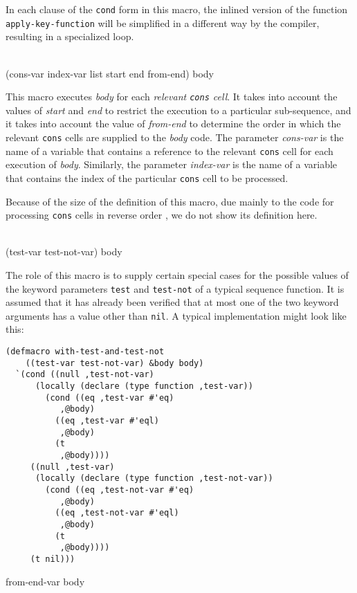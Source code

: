 In each clause of the \texttt{cond} form in this macro, the inlined
version of the function \texttt{apply-key-function} will be simplified
in a different way by the compiler, resulting in a specialized loop.

\\
{(cons-var index-var list start end from-end) \body body}

This macro executes \textit{body} for each \emph{relevant
  \texttt{cons} cell}.  It takes into account the values of
\textit{start} and \textit{end} to restrict the execution to a
particular sub-sequence, and it takes into account the value of
\textit{from-end} to determine the order in which the relevant
\texttt{cons} cells are supplied to the \textit{body} code.  The
parameter \textit{cons-var} is the name of a variable that contains a
reference to the relevant \texttt{cons} cell for each execution of
\textit{body}.  Similarly, the parameter \textit{index-var} is the
name of a variable that contains the index of the particular
\texttt{cons} cell to be processed.

Because of the size of the definition of this macro, due mainly to the
code for processing \texttt{cons} cells in reverse order
\cite{Durand:2015:ELS:reverse}, we do not show its definition here.

\\
{(test-var test-not-var) \body body}

The role of this macro is to supply certain special cases for the
possible values of the keyword parameters \texttt{test} and
\texttt{test-not} of a typical sequence function.  It is assumed that
it has already been verified that at most one of the two keyword
arguments has a value other than \texttt{nil}.  A typical
implementation might look like this:

{\small\begin{verbatim}
(defmacro with-test-and-test-not
    ((test-var test-not-var) &body body)
  `(cond ((null ,test-not-var)
	  (locally (declare (type function ,test-var))
	    (cond ((eq ,test-var #'eq)
		   ,@body)
		  ((eq ,test-var #'eql)
		   ,@body)
		  (t
		   ,@body))))
	 ((null ,test-var)
	  (locally (declare (type function ,test-not-var))
	    (cond ((eq ,test-not-var #'eq)
		   ,@body)
		  ((eq ,test-not-var #'eql)
		   ,@body)
		  (t
		   ,@body))))
	 (t nil)))
\end{verbatim}}

 {from-end-var \body body}

